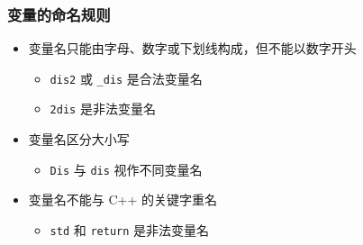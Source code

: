 \begin{frame}[fragile]
    \frametitle{变量的命名规则}

    \begin{itemize}

        \item<1-> 变量名只能由字母、数字或下划线构成，但不能以数字开头

            \begin{itemize}
                \item \lstinline|dis2| 或 \lstinline|_dis| 是合法变量名
                \item \lstinline|2dis| 是非法变量名
            \end{itemize}

        \item<2-> 变量名区分大小写

            \begin{itemize}
                \item \lstinline|Dis| 与 \lstinline|dis| 视作不同变量名
            \end{itemize}

        \item<3-> 变量名不能与 C++ 的关键字重名

            \begin{itemize}
                \item \lstinline|std| 和 \lstinline|return| 是非法变量名
            \end{itemize}

    \end{itemize}
\end{frame}

